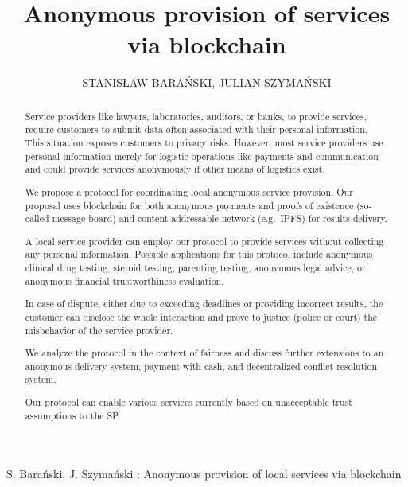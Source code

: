 \documentclass{ieeeaccess}
\begin{document}

\title{Anonymous provision of services via blockchain}
\author{\uppercase{Stanis\l{}aw Bara{\'n}ski},
\uppercase{Julian Szyma{\'n}ski } 
 }

\address[1]{Department of Electronic, Telecommunication and Informatics, Gdansk University of Technology, Narutowicza 11/12 Gdansk Poland (e-mail: stanislaw.baranski@pg.edu.pl, julian.szymanski@eti.pg.edu.pl}

 


{S. Bara{\'n}ski, J. Szyma{\'n}ski : 
Anonymous provision of local services via blockchain}


\begin{abstract}
Service providers like lawyers, laboratories, auditors, or banks, to
provide services, require customers to submit data often
associated with their personal information. This situation exposes
customers to privacy risks. However, most service providers use personal information merely for logistic operations like payments
and communication and could provide services anonymously if other means of logistics exist.

We propose a protocol for coordinating local anonymous service
provision. Our proposal uses blockchain for both anonymous payments and proofs of existence (so-called message board) and content-addressable network (e.g.~IPFS) for results delivery.

A local service provider can employ our protocol to provide
services without collecting any personal information. Possible
applications for this protocol include anonymous clinical drug testing,
steroid testing, parenting testing, anonymous legal advice, or
anonymous financial trustworthiness evaluation.

In case of dispute, either due to exceeding deadlines or providing
incorrect results, the customer can disclose the whole interaction and
prove to justice (police or court) the misbehavior of the service
provider.

We analyze the protocol in the context of fairness and discuss further
extensions to an anonymous delivery system, payment with cash, and
decentralized conflict resolution system.

Our protocol can enable various services currently based on unacceptable trust assumptions to the SP.
\end{abstract}
\end{document}
